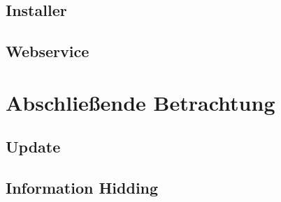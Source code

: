 	\subsection{Installer}
	\subsection{Webservice}

\section{Abschließende Betrachtung}
	\subsection{Update }%
	\subsection{Information Hidding} %

